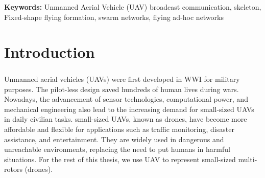 \documentclass[a4paper,12pt]{report}
\begin{document}
    \textbf{Keywords:} {Unmanned Aerial Vehicle (UAV) broadcast communication, skeleton, Fixed-shape flying formation, swarm networks, flying ad-hoc networks}


\setcounter{page}{3}
\tableofcontents 
\newpage
{}
\listoffigures \newpage
{}

\chapter{Introduction}

\paragraph{}
Unmanned aerial vehicles (UAVs) were first developed in WWI for military purposes\cite{4161584}. The pilot-less design saved hundreds of human lives during wars. Nowadays, the advancement of sensor technologies, computational power, and mechanical engineering also lead to the increasing demand for small-sized UAVs in daily civilian tasks. small-sized UAVs, known as drones, have become more affordable and flexible for applications such as traffic monitoring, disaster assistance, and entertainment\cite{1,2,3}. They are widely used in dangerous and unreachable environments, replacing the need to put humans in harmful situations. For the rest of this thesis,  we use UAV to represent small-sized multi-rotors (drones).
\end{document}
